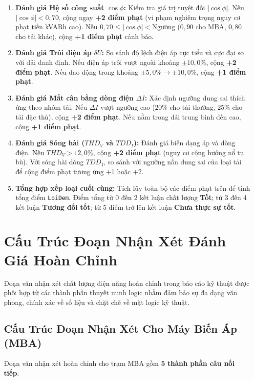 \documentclass[12pt,a4paper]{article}
\begin{document}
\begin{enumerate}
  \item \textbf{Đánh giá Hệ số công suất $\cos\phi$:}
  Kiểm tra giá trị tuyệt đối $|\cos\phi|$. Nếu $|\cos\phi| < 0{,}70$, cộng ngay \textbf{+2 điểm phạt} (vi phạm nghiêm trọng nguy cơ phạt tiền kVARh cao). Nếu $0{,}70 \le |\cos\phi| < \text{Ngưỡng}$ ($0{,}90$ cho MBA, $0{,}80$ cho tải khác), cộng \textbf{+1 điểm phạt} cảnh báo.

  \item \textbf{Đánh giá Trôi điện áp $\delta U$:}
  So sánh độ lệch điện áp cực tiểu và cực đại so với dải danh định. Nếu điện áp trôi vượt ngoài khoảng $\pm 10{,}0\%$, cộng \textbf{+2 điểm phạt}. Nếu dao động trong khoảng $\pm 5{,}0\% \to \pm 10{,}0\%$, cộng \textbf{+1 điểm phạt}.

  \item \textbf{Đánh giá Mất cân bằng dòng điện $\Delta I$:}
  Xác định ngưỡng dung sai thích ứng theo nhóm tải. Nếu $\Delta I$ vượt ngưỡng cao ($20\%$ cho tải thường, $25\%$ cho tải đặc thù), cộng \textbf{+2 điểm phạt}. Nếu nằm trong dải trung bình đến cao, cộng \textbf{+1 điểm phạt}.

  \item \textbf{Đánh giá Sóng hài ($THD_V$ và $TDD_I$):}
  Đánh giá biến dạng áp và dòng điện. Nếu $THD_V > 12{,}0\%$, cộng \textbf{+2 điểm phạt} (nguy cơ cộng hưởng nổ tụ bù). Với sóng hài dòng $TDD_I$, so sánh với ngưỡng nắn dung sai của loại tải để cộng điểm phạt tương ứng +1 hoặc +2.

  \item \textbf{Tổng hợp xếp loại cuối cùng:}
  Tích lũy toàn bộ các điểm phạt trên để tính tổng điểm \texttt{LoiDem}. Điểm tổng từ 0 đến 2 kết luận chất lượng \textbf{Tốt}; từ 3 đến 4 kết luận \textbf{Tương đối tốt}; từ 5 điểm trở lên kết luận \textbf{Chưa thực sự tốt}.
\end{enumerate}

\clearpage
\section{Cấu Trúc Đoạn Nhận Xét Đánh Giá Hoàn Chỉnh}

Đoạn văn nhận xét chất lượng điện năng hoàn chỉnh trong báo cáo kỹ thuật được phối hợp từ các thành phần thuyết minh logic nhằm đảm bảo sự đa dạng văn phong, chính xác về số liệu và chặt chẽ về mặt logic kỹ thuật.

\subsection{Cấu Trúc Đoạn Nhận Xét Cho Máy Biến Áp (MBA)}
Đoạn văn nhận xét hoàn chỉnh cho trạm MBA gồm \textbf{5 thành phần câu nối tiếp}:
\end{document}
